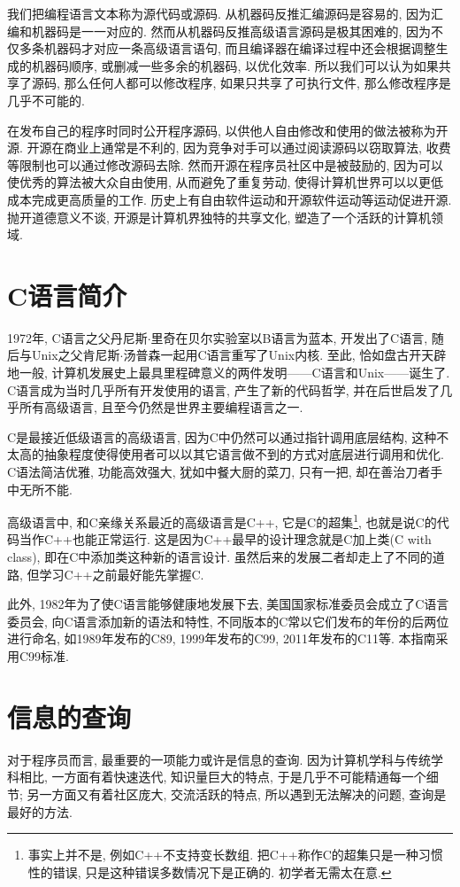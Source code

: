         我们把编程语言文本称为源代码或源码. 从机器码反推汇编源码是容易的, 因为汇编和机器码是一一对应的. 然而从机器码反推高级语言源码是极其困难的, 因为不仅多条机器码才对应一条高级语言语句, 而且编译器在编译过程中还会根据调整生成的机器码顺序, 或删减一些多余的机器码, 以优化效率. 所以我们可以认为如果共享了源码, 那么任何人都可以修改程序, 如果只共享了可执行文件, 那么修改程序是几乎不可能的. 
        
        在发布自己的程序时同时公开程序源码, 以供他人自由修改和使用的做法被称为开源. 开源在商业上通常是不利的, 因为竞争对手可以通过阅读源码以窃取算法, 收费等限制也可以通过修改源码去除. 然而开源在程序员社区中是被鼓励的, 因为可以使优秀的算法被大众自由使用, 从而避免了重复劳动, 使得计算机世界可以以更低成本完成更高质量的工作. 历史上有自由软件运动和开源软件运动等运动促进开源. 抛开道德意义不谈, 开源是计算机界独特的共享文化, 塑造了一个活跃的计算机领域.

    \section{C语言简介} \label{C语言简介}
        1972年, C语言之父丹尼斯$\cdot$里奇在贝尔实验室以B语言为蓝本, 开发出了C语言, 随后与Unix之父肯尼斯$\cdot$汤普森一起用C语言重写了Unix内核. 至此, 恰如盘古开天辟地一般, 计算机发展史上最具里程碑意义的两件发明——C语言和Unix——诞生了. C语言成为当时几乎所有开发使用的语言, 产生了新的代码哲学, 并在后世启发了几乎所有高级语言, 且至今仍然是世界主要编程语言之一. 
        
        C是最接近低级语言的高级语言, 因为C中仍然可以通过指针调用底层结构, 这种不太高的抽象程度使得使用者可以以其它语言做不到的方式对底层进行调用和优化. C语法简洁优雅, 功能高效强大, 犹如中餐大厨的菜刀, 只有一把, 却在善治刀者手中无所不能.

        高级语言中, 和C亲缘关系最近的高级语言是C++, 它是C的超集\footnote{事实上并不是, 例如C++不支持变长数组. 把C++称作C的超集只是一种习惯性的错误, 只是这种错误多数情况下是正确的. 初学者无需太在意.}, 也就是说C的代码当作C++也能正常运行. 这是因为C++最早的设计理念就是C加上类(C with class), 即在C中添加类这种新的语言设计. 虽然后来的发展二者却走上了不同的道路, 但学习C++之前最好能先掌握C.

        此外, 1982年为了使C语言能够健康地发展下去, 美国国家标准委员会成立了C语言委员会, 向C语言添加新的语法和特性, 不同版本的C常以它们发布的年份的后两位进行命名, 如1989年发布的C89, 1999年发布的C99, 2011年发布的C11等. 本指南采用C99标准.

    \section{信息的查询} \label{信息的查询}
        对于程序员而言, 最重要的一项能力或许是信息的查询. 因为计算机学科与传统学科相比, 一方面有着快速迭代, 知识量巨大的特点, 于是几乎不可能精通每一个细节; 另一方面又有着社区庞大, 交流活跃的特点, 所以遇到无法解决的问题, 查询是最好的方法.

